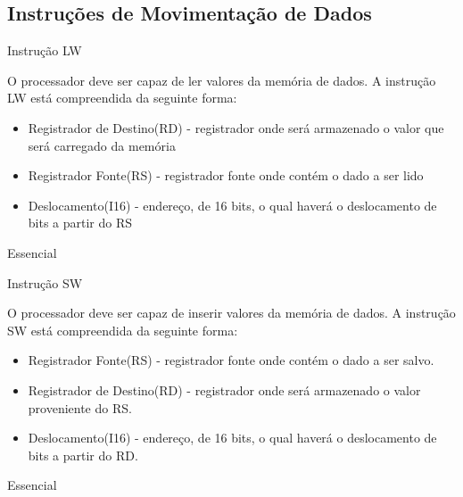 \documentclass{article}
\begin{document}
  \subsection{Instruções de Movimentação de Dados}
    \begin{functional}
     \requirement
      {Instrução LW}
      {O processador deve ser capaz de ler valores da memória de dados.
       A instrução LW está compreendida da seguinte forma:
       \begin{itemize}
        \item Registrador de Destino(RD) - registrador onde será armazenado o valor que será carregado da memória
        \item Registrador Fonte(RS) - registrador fonte onde contém o dado a ser lido
        \item Deslocamento(I16) - endereço, de 16 bits, o qual haverá o deslocamento de bits a partir do RS
       \end{itemize}
      }
      {Essencial}

     \requirement
      {Instrução SW}
      {O processador deve ser capaz de inserir valores da memória de dados.
      A instrução SW está compreendida da seguinte forma:
       \begin{itemize}
        \item Registrador Fonte(RS) - registrador fonte onde contém o dado a ser salvo.
        \item Registrador de Destino(RD) - registrador onde será armazenado o valor proveniente do RS.
        \item Deslocamento(I16) - endereço, de 16 bits, o qual haverá o deslocamento de bits a partir do RD.
       \end{itemize}}
      {Essencial}
    \end{functional}
\end{document}
